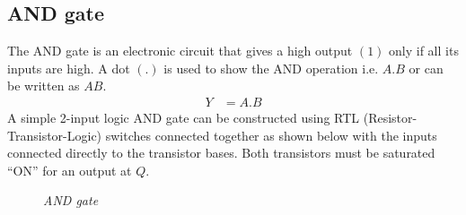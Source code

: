 	\subsection{AND gate}
	The AND gate is an electronic circuit that gives a high output $(1)$ only if all its inputs are high. A dot $(.)$ is used to show the AND operation i.e. $A.B$ or can be written as $AB$.
	\begin{align*}
		Y &= A . B
	\end{align*}
	A simple 2-input logic AND gate can be constructed using RTL (Resistor-Transistor-Logic) switches connected together as shown below with the inputs connected directly to the transistor bases. Both transistors must be saturated “ON” for an output at $Q$.
	\begin{figure}[ht]
		\centering 
		\hfill
		\hfill
		\caption{\textit{AND gate}}
	\end{figure}
	
	
